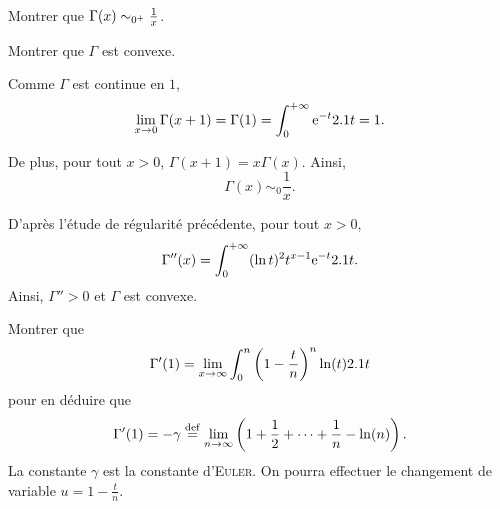
\begin{exercice}
\begin{questions}
\item Montrer que $\Gamma(x) \isEquivTo{0^+} \frac{1}{x}$.

\item Montrer que $\Gamma$ est convexe.
\end{questions}
\end{exercice}

\begin{solution}
\begin{reponses}
\item Comme $\Gamma$ est continue en $1$, 
\[
\lim_{x\to0} \Gamma(x + 1) = \Gamma(1) = \int_0^{+\infty} \mathrm{e}^{-t} 2.1 t = 1.
\]

De plus, pour tout $x > 0$, $\Gamma(x + 1) = x \Gamma(x)$. Ainsi,
\[
\Gamma(x) \sim_0 \frac{1}{x}.
\]

\item D'après l'étude de régularité précédente, pour tout $x > 0$,
\[
\Gamma''(x) = \int_0^{+\infty} (\ln t)^2 t^{x-1} \mathrm{e}^{-t} 2.1 t.
\]
Ainsi, $\Gamma'' > 0$ et $\Gamma$ est convexe.
\end{reponses}
\end{solution}


\begin{exercice}
    Montrer que 
    \[
    \Gamma'(1) = \lim_{x \to \infty} \int_0^n \left(1 - \frac{t}{n} \right)^n \ln(t) 2.1 t
    \]
    pour en déduire que 
    \[
    \Gamma'(1) = - \gamma \overset{\mathrm{\tiny def}}{=} \lim_{n \to \infty} \left(1 + \frac{1}{2} + \cdots + \frac{1}{n} - \ln(n) \right).
    \]
    La constante $\gamma$ est la constante d'\textsc{Euler}. On pourra effectuer le changement de variable $u = 1 - \frac{t}{n}$.
\end{exercice}

